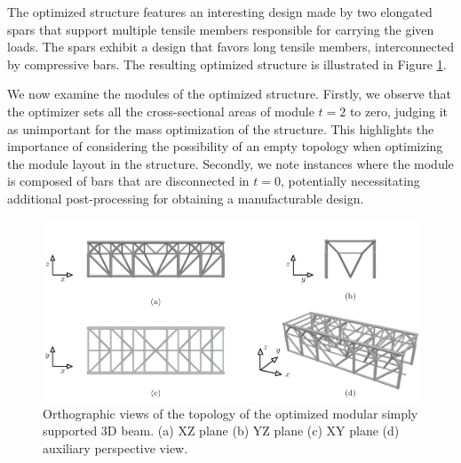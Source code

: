 The optimized structure features an interesting design made by two elongated spars that support multiple tensile members responsible for carrying the given loads. The spars exhibit a design that favors long tensile members, interconnected by compressive bars. The resulting optimized structure is illustrated in Figure \ref{fig:05_multiple_topology_sol}.

We now examine the modules of the optimized structure. Firstly, we observe that the optimizer sets all the cross-sectional areas of module $t=2$ to zero, judging it as unimportant for the mass optimization of the structure. This highlights the importance of considering the possibility of an empty topology when optimizing the module layout in the structure. Secondly, we note instances where the module is composed of bars that are disconnected \eg in $t=0$, potentially necessitating additional post-processing for obtaining a manufacturable design.

\begin{figure}
    \centering
    \includegraphics{figures/05_cellular_opt/00_multiple_topology/support_sol.pdf}
    \caption{Orthographic views of the topology of the optimized modular simply supported 3D beam. (a) XZ plane (b) YZ plane (c) XY plane (d) auxiliary perspective view.}
    \label{fig:05_multiple_topology_sol}
\end{figure}

